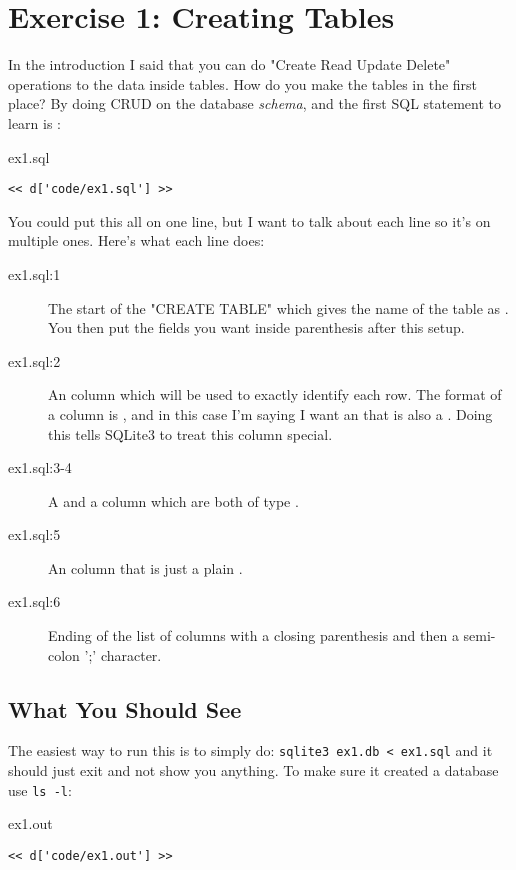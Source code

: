 \chapter{Exercise 1: Creating Tables}

In the introduction I said that you can do "Create Read Update Delete" operations to the data
inside tables.  How do you make the tables in the first place?  By doing CRUD on the database
\emph{schema}, and the first SQL statement to learn is :

\begin{code}{ex1.sql}
\begin{Verbatim}
<< d['code/ex1.sql'] >>
\end{Verbatim}
\end{code}

You could put this all on one line, but I want to talk about each line
so it's on multiple ones.  Here's what each line does:

\begin{description}
\item[ex1.sql:1] The start of the "CREATE TABLE" which gives the name of the
    table as . You then put the fields you want inside parenthesis
    after this setup.
\item[ex1.sql:2] An  column which will be used to exactly identify
    each row.  The format of a column is , and in this case
    I'm saying I want an  that is also a .
    Doing this tells SQLite3 to treat this column special.
\item[ex1.sql:3-4] A  and a  column 
    which are both of type .
\item[ex1.sql:5] An  column that is just a plain .
\item[ex1.sql:6] Ending of the list of columns with a closing parenthesis and
    then a semi-colon ';' character.
\end{description}


\section{What You Should See}

The easiest way to run this is to simply do: \verb|sqlite3 ex1.db < ex1.sql| and
it should just exit and not show you anything.  To make sure it created a
database use \verb|ls -l|:


\begin{code}{ex1.out}
\begin{Verbatim}
<< d['code/ex1.out'] >>
\end{Verbatim}
\end{code}


